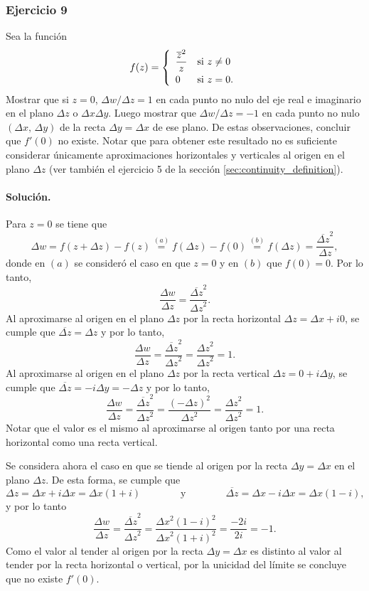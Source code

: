 \documentclass[a4paper]{report}
\begin{document}
\subsubsection{Ejercicio 9}
 
Sea la función 
\[
 f(z)=\left\{ 
 \begin{array}{ll}
  \dfrac{\overline{z}^2}{z} & \textrm{si }z\neq0\\[\medskipamount]
  0 & \textrm{si }z=0.
 \end{array}
 \right.
\]
Mostrar que si \(z=0\), \(\Delta w/\Delta z=1\) en cada punto no nulo del eje real e imaginario en el plano \(\Delta z\) o \(\Delta x\Delta y\). Luego mostrar que \(\Delta w/\Delta z=-1\) en cada punto no nulo \((\Delta x,\,\Delta y)\) de la recta \(\Delta y=\Delta x\) de ese plano. De estas observaciones, concluir que \(f'(0)\) no existe. Notar que para obtener este resultado no es suficiente considerar únicamente aproximaciones horizontales y verticales al origen en el plano \(\Delta z\) (ver también el ejercicio 5 de la sección \ref{sec:continuity_definition}).
 
\paragraph{Solución.} Para \(z=0\) se tiene que 
\[
 \Delta w=f(z+\Delta z)-f(z)\overset{(a)}{=}f(\Delta z)-f(0)\overset{(b)}{=}f(\Delta z)=\frac{\overline{\Delta z}^2}{\Delta z},
\]
donde en \((a)\) se consideró el caso en que \(z=0\) y en \((b)\) que \(f(0)=0\). Por lo tanto,
\[
 \frac{\Delta w}{\Delta z}=\frac{\overline{\Delta z}^2}{{\Delta z}^2}.
\]
Al aproximarse al origen en el plano \(\Delta z\) por la recta horizontal \(\Delta z=\Delta x+i0\),  se cumple que \(\overline{\Delta z}=\Delta z\) y por lo tanto,
\[
 \frac{\Delta w}{\Delta z}=\frac{\overline{\Delta z}^2}{{\Delta z}^2}=\frac{{\Delta z}^2}{{\Delta z}^2}=1.
\]
Al aproximarse al origen en el plano \(\Delta z\) por la recta vertical \(\Delta z=0+i\Delta y\), se cumple que \(\overline{\Delta z}=-i\Delta y=-\Delta z\) y por lo tanto,
\[
 \frac{\Delta w}{\Delta z}=\frac{\overline{\Delta z}^2}{{\Delta z}^2}=\frac{(-\Delta z)^2}{{\Delta z}^2}=\frac{{\Delta z}^2}{{\Delta z}^2}=1.
\]
Notar que el valor es el mismo al aproximarse al origen tanto por una recta horizontal como una recta vertical. 

Se considera ahora el caso en que se tiende al origen por la recta \(\Delta y=\Delta x\) en el plano \(\Delta z\). De esta forma, se cumple que 
\[
 \Delta z=\Delta x+i\Delta x=\Delta x(1+i)
 \qquad\qquad\textrm{y}\qquad\qquad
 \overline{\Delta z}=\Delta x-i\Delta x=\Delta x(1-i),
\]
y por lo tanto
\[
 \frac{\Delta w}{\Delta z}=\frac{\overline{\Delta z}^2}{{\Delta z}^2}
  =\frac{{\Delta x}^2(1-i)^2}{{\Delta x}^2(1+i)^2}=\frac{-2i}{2i}=-1.
\]
Como el valor al tender al origen por la recta \(\Delta y=\Delta x\) es distinto al valor al tender por la recta horizontal o vertical, por la unicidad del límite se concluye que no existe \(f'(0)\).
\end{document}
